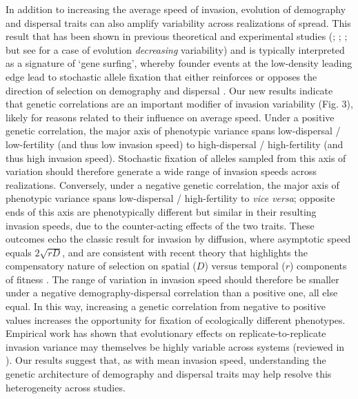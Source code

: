 \documentclass[11pt]{article}
\begin{document}
In addition to increasing the average speed of invasion, evolution of demography and dispersal traits can also amplify variability across realizations of spread.
This result that has been shown in previous theoretical and experimental studies (\citealt{ochocki_rapid_2017}; \citealt{weiss-lehman_rapid_2017}; \citealt{phillips_evolutionary_2015}; but see \citealt{williams_rapid_2016} for a case of evolution \textit{decreasing} variability) and is typically interpreted as a signature of `gene surfing', whereby founder events at the low-density leading edge lead to stochastic allele fixation that either reinforces or opposes the direction of selection on demography and dispersal \citep{edmonds_mutations_2004,klopfstein_fate_2006,excoffier_surfing_2008,peischl_expansion_2015}.
Our new results indicate that genetic correlations are an important modifier of invasion variability (Fig. 3), likely for reasons related to their influence on average speed.
Under a positive genetic correlation, the major axis of phenotypic variance spans low-dispersal / low-fertility (and thus low invasion speed) to high-dispersal / high-fertility (and thus high invasion speed).
Stochastic fixation of alleles sampled from this axis of variation should therefore generate a wide range of invasion speeds across realizations.
Conversely, under a negative genetic correlation, the major axis of phenotypic variance spans low-dispersal / high-fertility to \textit{vice versa}; opposite ends of this axis are phenotypically different but similar in their resulting invasion speeds, due to the counter-acting effects of the two traits.
These outcomes echo the classic result for invasion by diffusion, where asymptotic speed equals $2\sqrt{rD}$, and are consistent with recent theory that highlights the compensatory nature of selection on spatial ($D$) versus temporal ($r$) components of fitness \citep{phillips2018spatial}.
The range of variation in invasion speed should therefore be smaller under a negative demography-dispersal correlation than a positive one, all else equal.
In this way, increasing a genetic correlation from negative to positive values increases the opportunity for fixation of ecologically different phenotypes.
Empirical work has shown that evolutionary effects on replicate-to-replicate invasion variance may themselves be highly variable across systems (reviewed in \citealt{williams2019evolution}).
Our results suggest that, as with mean invasion speed, understanding the genetic architecture of demography and dispersal traits may help resolve this heterogeneity across studies.
\end{document}
